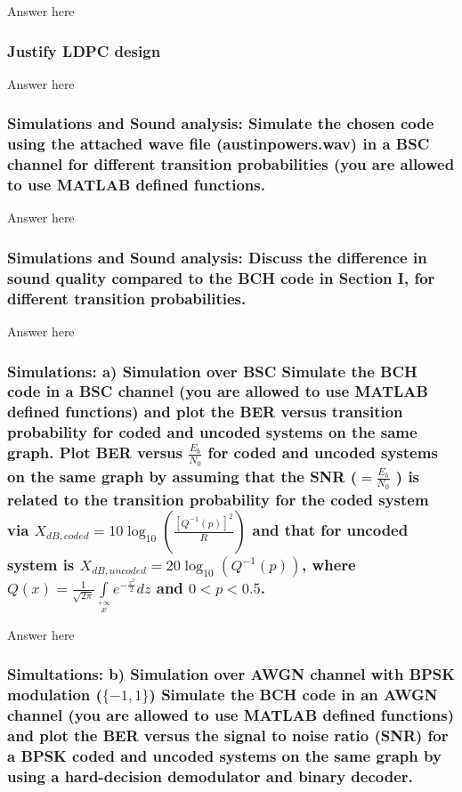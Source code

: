 \documentclass[a4paper]{report}
\begin{document}
Answer here \\

\subsubsection*{Justify LDPC design}

Answer here \\

\subsubsection*{Simulations and Sound analysis: Simulate the chosen code using the attached wave file (austinpowers.wav) in a BSC channel for different transition probabilities (you are allowed to use MATLAB defined functions.}

Answer here \\

\subsubsection*{Simulations and Sound analysis: Discuss the difference in sound quality compared to the BCH code in Section I, for different transition probabilities.}

Answer here \\

\subsubsection*{Simulations: a) Simulation over BSC Simulate the BCH code in a BSC channel (you are allowed to use MATLAB defined functions) and plot the BER versus transition probability for coded and uncoded systems on the same graph. Plot BER versus $\frac{E_b}{N_0}$ for coded and uncoded systems on the same graph by assuming that the SNR ($ = \frac{E_b}{N_0}$ ) is related to the transition probability for the coded system via $X_{dB,coded} = 10 \log_{10}(\frac{[Q^{−1} (p)]^2}{R}) $ and that for uncoded system is $X_{dB,uncoded} = 20\log_{10}(Q^{−1} (p)) $, where $Q(x) = \frac{1}{\sqrt{2 \pi}} \int\limits_{x}\limits^{+\infty} e^{ -\frac{z^2}{2}} dz $ and $0 < p < 0.5$.}

Answer here \\

\subsubsection*{Simultations: b) Simulation over AWGN channel with BPSK modulation ($\{−1, 1\}$) Simulate the BCH code in an AWGN channel (you are allowed to use MATLAB defined functions) and plot the BER versus the signal to noise ratio (SNR) for a BPSK coded and uncoded
systems on the same graph by using a hard-decision demodulator and binary decoder.}
\end{document}
